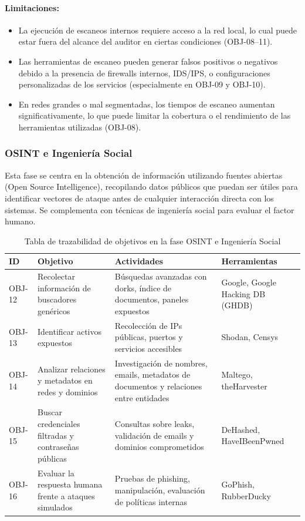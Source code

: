 \documentclass[a4paper, 10pt]{article}
\begin{document}
\paragraph{Limitaciones:}
\begin{itemize}
    \item La ejecución de escaneos internos requiere acceso a la red local, lo cual puede estar fuera del alcance del auditor en ciertas condiciones (OBJ-08–11).
    \item Las herramientas de escaneo pueden generar falsos positivos o negativos debido a la presencia de firewalls internos, IDS/IPS, o configuraciones personalizadas de los servicios (especialmente en OBJ-09 y OBJ-10).
    \item En redes grandes o mal segmentadas, los tiempos de escaneo aumentan significativamente, lo que puede limitar la cobertura o el rendimiento de las herramientas utilizadas (OBJ-08).
\end{itemize}
\clearpage

\subsubsection{OSINT e Ingeniería Social}

Esta fase se centra en la obtención de información utilizando fuentes abiertas (Open Source Intelligence), recopilando datos públicos que puedan ser útiles para identificar vectores de ataque antes de cualquier interacción directa con los sistemas. Se complementa con técnicas de ingeniería social para evaluar el factor humano.

\begin{table}[H]
\centering
\renewcommand{\arraystretch}{1.4}
    \begin{tabular}{|p{1.2cm}|p{3.9cm}|p{5.3cm}|p{4.2cm}|}
\hline
\textbf{ID} & \textbf{Objetivo} & \textbf{Actividades} & \textbf{Herramientas}  \\
\hline
OBJ-12 & Recolectar información de buscadores genéricos & Búsquedas avanzadas con dorks, índice de documentos, paneles expuestos & Google, Google Hacking DB (GHDB)  \\
\hline
OBJ-13 & Identificar activos expuestos & Recolección de IPs públicas, puertos y servicios accesibles & Shodan, Censys  \\
\hline
OBJ-14 & Analizar relaciones y metadatos en redes y dominios & Investigación de nombres, emails, metadatos de documentos y relaciones entre entidades & Maltego, theHarvester \\
\hline
OBJ-15 & Buscar credenciales filtradas y contraseñas públicas & Consultas sobre leaks, validación de emails y dominios comprometidos & DeHashed, HaveIBeenPwned  \\
\hline
OBJ-16 & Evaluar la respuesta humana frente a ataques simulados & Pruebas de phishing, manipulación, evaluación de políticas internas  & GoPhish, RubberDucky \\
\hline
\end{tabular}
\caption{Tabla de trazabilidad de objetivos en la fase OSINT e Ingeniería Social}
\end{table}
\end{document}
